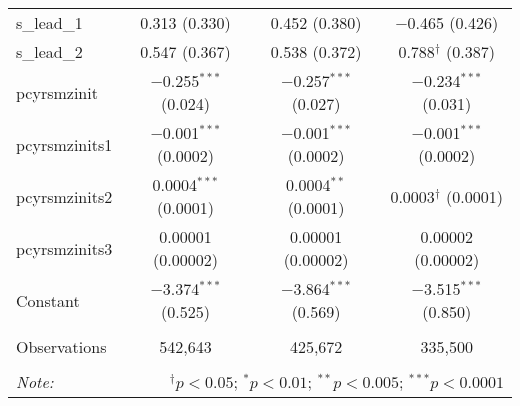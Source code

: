 \begin{table}[!htbp]
\begin{tabular}{@{\extracolsep{5pt}}lccc}
  s\_lead\_1 & 0.313 (0.330) & 0.452 (0.380) & $-$0.465 (0.426) \\ 
  s\_lead\_2 & 0.547 (0.367) & 0.538 (0.372) & 0.788$^{\dagger}$ (0.387) \\ 
  pcyrsmzinit & $-$0.255$^{***}$ (0.024) & $-$0.257$^{***}$ (0.027) & $-$0.234$^{***}$ (0.031) \\ 
  pcyrsmzinits1 & $-$0.001$^{***}$ (0.0002) & $-$0.001$^{***}$ (0.0002) & $-$0.001$^{***}$ (0.0002) \\ 
  pcyrsmzinits2 & 0.0004$^{***}$ (0.0001) & 0.0004$^{**}$ (0.0001) & 0.0003$^{\dagger}$ (0.0001) \\ 
  pcyrsmzinits3 & 0.00001 (0.00002) & 0.00001 (0.00002) & 0.00002 (0.00002) \\ 
  Constant & $-$3.374$^{***}$ (0.525) & $-$3.864$^{***}$ (0.569) & $-$3.515$^{***}$ (0.850) \\ 
 \hline \\[-1.8ex] 
Observations & 542,643 & 425,672 & 335,500 \\ 
\hline 
\hline \\[-1.8ex] 
\textit{Note:}  & \multicolumn{3}{r}{$^{\dagger} p<0.05$; $^{*} p<0.01$; $^{**} p<0.005$; $^{***} p<0.0001$} \\ 
\end{tabular} 
\end{table} 
